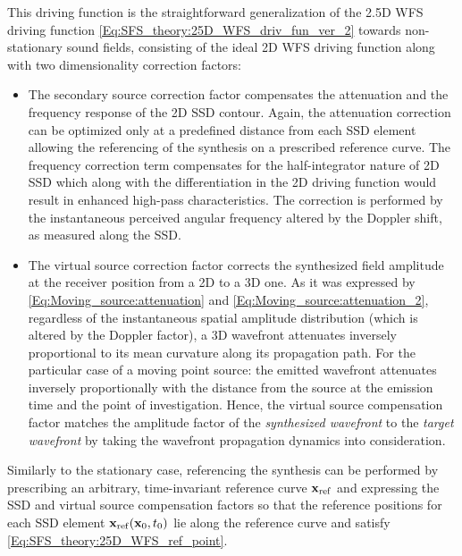 This driving function is the straightforward generalization of the 2.5D WFS driving function \eqref{Eq:SFS_theory:25D_WFS_driv_fun_ver_2} towards non-stationary sound fields, consisting of the ideal 2D WFS driving function along with two dimensionality correction factors:
\begin{itemize}
\item The secondary source correction factor compensates the attenuation and the frequency response of the 2D SSD contour.
Again, the attenuation correction can be optimized only at a predefined distance from each SSD element allowing the referencing of the synthesis on a prescribed reference curve.
The frequency correction term compensates for the half-integrator nature of 2D SSD which along with the differentiation in the 2D driving function would result in enhanced high-pass characteristics.
The correction is performed by the instantaneous perceived angular frequency altered by the Doppler shift, as measured along the SSD.
\item The virtual source correction factor corrects the synthesized field amplitude at the receiver position from a 2D to a 3D one.
As it was expressed by \eqref{Eq:Moving_source:attenuation} and \eqref{Eq:Moving_source:attenuation_2}, regardless of the instantaneous spatial amplitude distribution (which is altered by the Doppler factor), a 3D wavefront attenuates inversely proportional to its mean curvature along its propagation path.
For the particular case of a moving point source: the emitted wavefront attenuates inversely proportionally with the distance from the source at the emission time and the point of investigation.
Hence, the virtual source compensation factor matches the amplitude factor of the \emph{synthesized wavefront} to the \emph{target wavefront} by taking the wavefront propagation dynamics into consideration.
\end{itemize}
Similarly to the stationary case, referencing the synthesis can be performed by prescribing an arbitrary, time-invariant reference curve $\mathbf{x}_{\mathrm{ref}}$ and expressing the SSD and virtual source compensation factors so that the reference positions for each SSD element $\mathbf{x}_{\mathrm{ref}}(\mathbf{x}_0,t_0)$ lie along the reference curve and satisfy \eqref{Eq:SFS_theory:25D_WFS_ref_point}.

